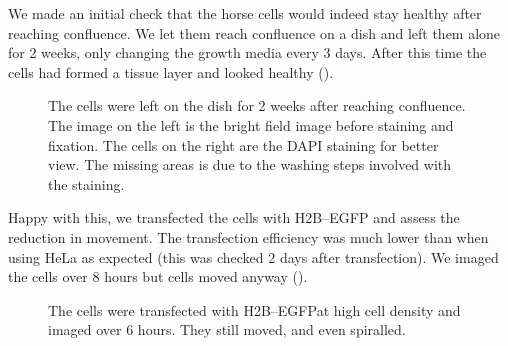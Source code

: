     We made an initial check that the horse cells would indeed stay healthy after reaching confluence.
    We let them reach confluence on a dish and left them alone for 2 weeks, only changing the growth
    media every 3 days. After this time the cells had formed a tissue layer and looked healthy ().
    
    \begin{figure}
      \centering
                   {The cells were left on the dish for 2 weeks after reaching confluence. The
                    image on the left is the bright field image before staining and fixation.
                    The cells on the right are the DAPI staining for better view. The missing
                    areas is due to the washing steps involved with the staining.}
      \label{fig:healthy-horse}
    \end{figure}
    
    Happy with this, we transfected the cells with H2B--EGFP and assess the reduction in movement.
    The transfection efficiency was much lower than when using HeLa as expected (this was checked 2 days
    after transfection). We imaged the cells over 8 hours but cells moved anyway ().
    
    \begin{figure}
      \centering
                   {The cells were transfected with H2B--EGFPat high cell density and
                    imaged over 6 hours. They still moved, and even spiralled.}
      \label{fig:horse-moving}
    \end{figure}



